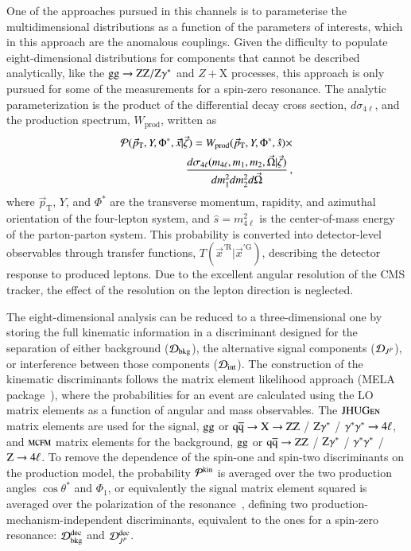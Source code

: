 One of the approaches pursued in this channels is to parameterise the
multidimensional distributions as a function of the parameters of
interests, which in this approach are the anomalous couplings. Given
the difficulty to populate eight-dimensional distributions for
components that cannot be described analytically, like the
$\mathrm{g}\mathrm{g}\to\mathrm{Z}\mathrm{Z}/\mathrm{Z}\gamma^*$ and $Z+$X processes, this approach is only
pursued for some of the measurements for a spin-zero resonance.
The analytic parameterization is the product of the differential decay cross section, 
$d\sigma_{4\ell}$, and the production spectrum, $W_{\mathrm{prod}}$, written as
%
\begin{eqnarray}
\label{eqn:gen_pdf}
{\cal P}(\vec{p}_\mathrm{T},Y,\Phi^*, \vec{x} | \vec{\zeta}) =
W_{\mathrm{prod}}(\vec{p}_\mathrm{T},Y,\Phi^*,\hat{s}) \times \\ \nonumber
\frac{d\sigma_{4\ell}(m_{4\ell},m_1, m_2, \vec\Omega | \vec{\zeta})}{dm_1^2dm_2^2d\vec\Omega}\,, 
\end{eqnarray}
%
where $\vec{p}_\mathrm{T}$, $Y$, and $\Phi^*$ are the transverse
momentum, rapidity, and azimuthal orientation of the four-lepton
system, and $\hat{s}=m_{4\ell}^2$ is the center-of-mass energy of the
parton-parton system. This probability is converted into
detector-level observables through transfer functions,
$T({\vec{x}^{\prime\mathrm{R}}} | \vec{x}^{\prime\mathrm{G}})$,
describing the detector response to produced leptons. Due to the
excellent angular resolution of the CMS tracker, the effect of the
resolution on the lepton direction is neglected.


The eight-dimensional analysis can be reduced to a three-dimensional
one by storing the full kinematic information in a discriminant
designed for the separation of either background (${\cal D}_{\rm
  bkg}$), the alternative signal components (${\cal D}_{J^P}$), or
interference between those components (${\cal D}_{\rm int}$).  The
construction of the kinematic discriminants follows the matrix element
likelihood approach ({\sc MELA}
package~\cite{Chatrchyan:2012ufa,Gao:2010qx,Bolognesi:2012mm,Anderson:2013afp}),
where the probabilities for an event are calculated using the LO
matrix elements as a function of angular and mass observables.  The
$\textsc{JHUGen}$ matrix elements are used for the signal, $\mathrm{g}\mathrm{g}$ or
$\mathrm{\mathrm{q}\mathrm{\overline{q}}}\to \mathrm{X}\to \mathrm{Z}\mathrm{Z}$ / $\mathrm{Z}\gamma^*$ / $\gamma^*\gamma^*\to4\ell$, and $\textsc{mcfm}$
matrix elements for the background, $\mathrm{g}\mathrm{g}$ or $\mathrm{\mathrm{q}\mathrm{\overline{q}}}\to\mathrm{Z}\mathrm{Z}$ /
$\mathrm{Z}\gamma^*$ / $\gamma^*\gamma^*$ / $\mathrm{Z}\to 4\ell$.
%
To remove the dependence of the spin-one and spin-two discriminants on
the production model, the probability ${\cal P}^{\rm kin}$ is averaged
over the two production angles $\cos\theta^*$ and $\Phi_1$, or
equivalently the signal matrix element squared is averaged over the
polarization of the resonance~\cite{Anderson:2013afp}, defining two
production-mechanism-independent discriminants, equivalent to the ones
for a spin-zero resonance: ${\cal D}^{\rm dec}_{\rm bkg}$ and ${\cal
  D}^{\rm dec}_{J^P}$.

